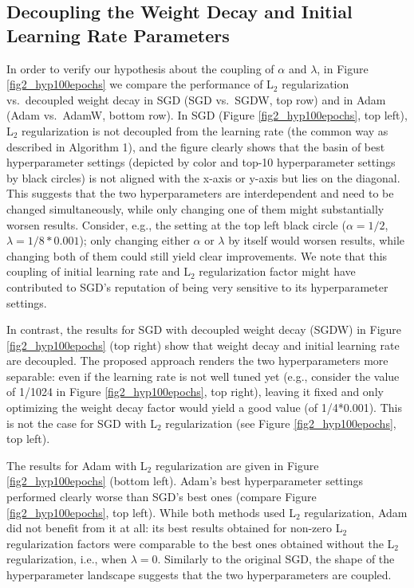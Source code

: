 \documentclass[usenames,dvipsnames]{article} %
\begin{document}
\subsection{Decoupling the Weight Decay and Initial Learning Rate Parameters}

In order to verify our hypothesis about the coupling of $\alpha$ and  $\lambda$, in Figure \ref{fig2_hyp100epochs} we compare the performance of L$_2$ regularization vs.\ decoupled weight decay in SGD (SGD vs.\ SGDW, top row) and in Adam (Adam vs.\ AdamW, bottom row). In SGD (Figure \ref{fig2_hyp100epochs}, top left), L$_2$ regularization is not decoupled from the learning rate (the common way as described in Algorithm 1), and the figure clearly shows that the basin of best hyperparameter settings (depicted by color and top-10 hyperparameter settings by black circles) is not aligned with the x-axis or y-axis but lies on the diagonal. This suggests that the two hyperparameters are interdependent and need to be changed simultaneously, while only changing one of them might substantially worsen results. Consider, e.g., the setting at the top left black circle ($\alpha=1/2$, $\lambda=1/8*0.001$); only changing either $\alpha$ or $\lambda$ by itself would worsen results, while changing both of them could still yield clear improvements. We note that this coupling of initial learning rate and L$_2$ regularization factor might have contributed to SGD's reputation of being very sensitive to its hyperparameter settings. 

In contrast, the results for SGD with decoupled weight decay (SGDW) in Figure \ref{fig2_hyp100epochs} (top right) show that weight decay and initial learning rate are decoupled. The proposed approach renders the two hyperparameters more separable: even if the learning rate is not well tuned yet (e.g., consider the value of 1/1024 in Figure \ref{fig2_hyp100epochs}, top right), leaving it fixed and only optimizing the weight decay factor would yield a good value (of 1/4*0.001). This is not the case for SGD with L$_2$ regularization (see Figure \ref{fig2_hyp100epochs}, top left). 


The results for Adam with L$_2$ regularization are given in Figure \ref{fig2_hyp100epochs} (bottom left). Adam's best hyperparameter settings performed clearly worse than SGD's best ones (compare Figure \ref{fig2_hyp100epochs}, top left). While both methods used L$_2$ regularization,  Adam did not benefit from it at all: its best results obtained for non-zero L$_2$ regularization factors were comparable to the best ones obtained without the L$_2$ regularization, i.e., when $\lambda=0$.   
Similarly to the original SGD, the shape of the hyperparameter landscape suggests that the two hyperparameters are coupled. 
\end{document}
